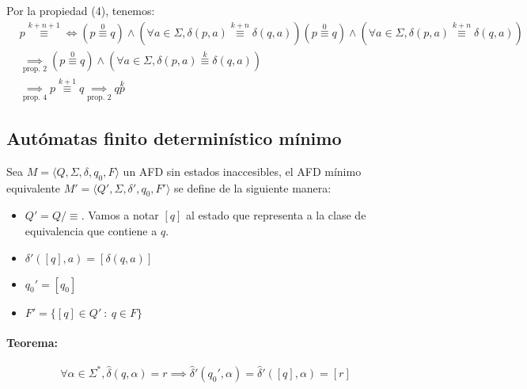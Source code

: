 \begin{enumerate}
\begin{demo}[\textwidth]
\begin{itemize}
              Por la propiedad (4), tenemos:
              \begin{align*}
                 & p\overset{k+n+1}{\equiv} \iff \left(p \overset{0}{\equiv}q\right)\land\left(
                \forall a\in\Sigma, \delta(p,a) \overset{k+n}{\equiv} \delta(q,a)
                \right)   \left(p \overset{0}{\equiv}q\right)\land\left(
                \forall a\in\Sigma, \delta(p,a) \overset{k+n}{\equiv} \delta(q,a)
                \right)                                                                                                              \\
                 & \underset{\text{prop. 2}}{\implies} \left(p \overset{0}{\equiv}q\right)\land\left(
                \forall a\in\Sigma, \delta(p,a) \overset{k}{\equiv} \delta(q,a) \right)                                              \\
                 & \underset{\text{prop. 4}}{\implies} p \overset{k+1}{\equiv}q \underset{\text{prop. 2}}{\implies} q \overset{k}{p}
              \end{align*}
          \end{itemize}
        \end{demo}
\end{enumerate}
\subsection{Autómatas finito determinístico mínimo}
Sea \(M=\langle Q, \Sigma, \delta, q_0, F\rangle\) un AFD sin estados inaccesibles, el AFD mínimo equivalente \(M'= \langle Q', \Sigma, \delta', q_0, F'\rangle\) se define de la siguiente manera:
\begin{itemize}
  \item \(Q' = Q / \equiv\). Vamos a notar \([q]\) al estado que representa a la clase de equivalencia que contiene a \(q\).
  \item \(\delta'([q], a) = [\delta(q,a)]\)
  \item \(q_0' = [q_0]\)
  \item \(F' = \{[q]\in Q'~:~ q \in F\}\)
\end{itemize}

\paragraph{Teorema:}
\[\forall \alpha\in\Sigma^*, \hat\delta(q, \alpha) = r \implies \hat\delta'(q_0', \alpha) = \hat\delta'([q], \alpha) = [r]\]

